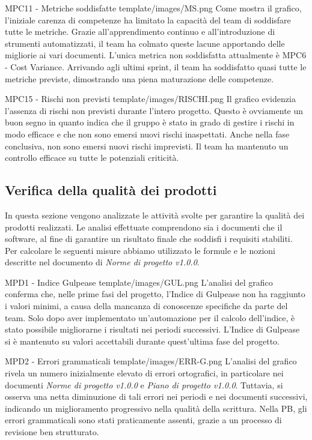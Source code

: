 \Met
{ %
    MPC11 - Metriche soddisfatte
}
{ %
    template/images/MS.png
}
{ %
    Come mostra il grafico, l'iniziale carenza di competenze ha limitato la capacità del team di soddisfare tutte le metriche.
    Grazie all'apprendimento continuo e all'introduzione di strumenti automatizzati, il team ha colmato queste lacune apportando delle migliorie ai vari documenti.
    L'unica metrica non soddisfatta attualmente è MPC6 - Cost Variance.
}
{ %
    Arrivando agli ultimi sprint, il team ha soddisfatto quasi tutte le metriche previste, dimostrando una piena maturazione delle competenze.
}

\Met
{ %
    MPC15 - Rischi non previsti
}
{ %
    template/images/RISCHI.png
}
{ %
    Il grafico evidenzia l'assenza di rischi non previsti durante l'intero progetto.
    Questo è ovviamente un buon segno in quanto indica che il gruppo è stato in grado 
    di gestire i rischi in modo efficace e che non sono emersi nuovi rischi inaspettati.
}
{ %
    Anche nella fase conclusiva, non sono emersi nuovi rischi imprevisti. Il team ha mantenuto un controllo efficace su tutte le potenziali criticità.
}

\subsection{Verifica della qualità dei prodotti}
In questa sezione vengono analizzate le attività svolte per garantire la qualità dei prodotti realizzati.
Le analisi effettuate comprendono sia i documenti che il software, al fine di garantire un risultato finale che soddisfi i requisiti stabiliti.\\
Per calcolare le seguenti misure abbiamo utilizzato le formule e le nozioni descritte nel documento di \textit{Norme di progetto v1.0.0}.

\Met
{ %
    MPD1 - Indice Gulpease
}
{ %
    template/images/GUL.png
}
{ %
    L'analisi del grafico conferma che, nelle prime fasi del progetto, l'Indice di Gulpease non ha raggiunto i 
    valori minimi, a causa della mancanza di conoscenze specifiche da parte del team.
    Solo dopo aver implementato un'automazione per il calcolo dell'indice, è stato possibile 
    migliorarne i risultati nei periodi successivi.
}
{ %
    L'Indice di Gulpease si è mantenuto su valori accettabili durante quest'ultima fase del progetto.
}

\Met
{ %
    MPD2 - Errori grammaticali
}
{ %
    template/images/ERR-G.png
}
{ %
    L'analisi del grafico rivela un numero inizialmente elevato di errori ortografici, 
    in particolare nei documenti \textit{Norme di progetto v1.0.0} e \textit{Piano di progetto v1.0.0}.
    Tuttavia, si osserva una netta diminuzione di tali errori nei periodi e nei 
    documenti successivi, indicando un miglioramento progressivo nella qualità della scrittura.
}
{ %
Nella PB, gli errori grammaticali sono stati praticamente assenti, grazie a un processo di revisione ben strutturato.
}



